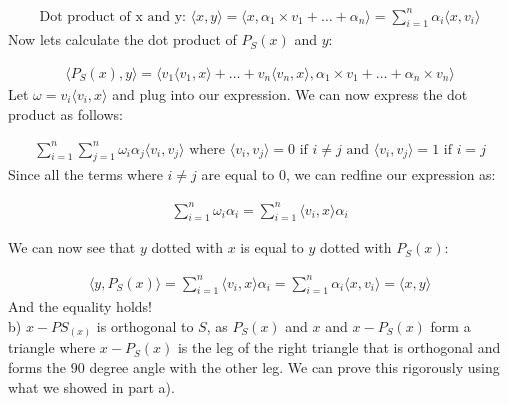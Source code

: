 \documentclass[12pt,twoside]{article}
\begin{document}
\begin{equation}
\begin{split}
     \text{Dot product of x and y: } \langle x,y \rangle = \langle x,  \alpha_1 \times v_1 + \dots + \alpha_n \rangle =\sum_{i=1} ^n \alpha_i \langle x,v_i \rangle
\end{split}
\end{equation}
Now lets calculate the dot product of $P_S(x)$ and $y$:

  \begin{equation}
\begin{split}
    \langle P_S(x), y \rangle = \langle v_1\langle v_1,x\rangle + \dots + v_n \langle v_n, x \rangle , \alpha_1 \times v_1 + \dots + \alpha_n \times v_n \rangle
\end{split}
\end{equation}
Let $\omega = v_i\langle v_i, x \rangle$ and plug into our expression. We can now express the dot product as follows:

  \begin{equation}
\begin{split}
    \sum _{i=1} ^n \sum _{j=1} ^n \omega_i \alpha_j \langle v_i, v_j \rangle \text{ where $\langle v_i, v_j \rangle = 0$ if $i\neq j $ and $\langle v_i, v_j \rangle =1$ if $i=j$}
\end{split}
\end{equation}
Since all the terms where $i\neq j$ are equal to $0$, we can redfine our expression as:

\begin{equation}
\begin{split}
     \sum_{i=1}^n \omega_i \alpha_i = \sum_{i=1}^n \langle v_i, x \rangle \alpha_i 
\end{split}
\end{equation}

We can now see that $y$ dotted with $x$ is equal to $y$ dotted with $P_S(x)$:

\begin{equation}
\begin{split}
     \langle y, P_S(x) \rangle = \sum_{i=1}^n \langle v_i, x \rangle \alpha_i = \sum_{i=1} ^n \alpha_i \langle x,v_i \rangle = \langle x,y \rangle
\end{split}
\end{equation}
And the equality holds! \\

b) $x-PS_(x)$ is orthogonal to $S$, as $P_S(x)$ and $x$ and $x-P_S(x)$ form a triangle where $x-P_S(x)$ is the leg of the right triangle that is orthogonal and forms the $90$ degree angle with the other leg. We can prove this rigorously using what we showed in part a). \\
\end{document}
